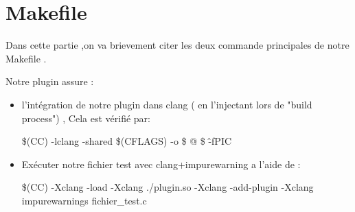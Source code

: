 \documentclass[12pt,titlepage]{article}
\begin{document}
\section{Makefile}
 Dans cette partie ,on va brievement citer les deux commande principales de notre Makefile .

Notre plugin assure :
\begin{itemize}
\item l’intégration de notre plugin dans clang ( en l’injectant lors de "build process") , Cela est vérifié par:

\$(CC) -lclang -shared \$(CFLAGS) -o  \$  @  \$ \^ -fPIC 

\item Exécuter notre fichier test avec clang+impurewarning a l’aide de :

\$(CC) -Xclang -load  -Xclang ./plugin.so -Xclang -add-plugin -Xclang impurewarnings fichier\_test.c

\end{itemize}





\pagebreak




\pagebreak 

\nocite{*} 



\end{document}
